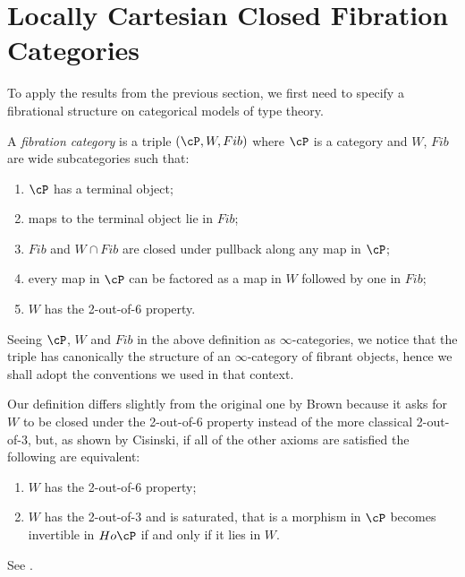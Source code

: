\chapter{Locally Cartesian Closed Fibration Categories}

To apply the results from the previous section, we first need to specify a
fibrational structure on categorical models of type theory.

\begin{defn}
  A \emph{fibration category} is a triple $(\cP,W,Fib)$ where $\cP$ is a
  category and $W$, $Fib$ are wide subcategories such that:
  \begin{enumerate}
    \item $\cP$ has a terminal object;
    \item maps to the terminal object lie in $Fib$;
    \item $Fib$ and $W\cap Fib$ are closed under pullback along any map in $\cP$;
    \item every map in $\cP$ can be factored as a map in $W$ followed by one in
      $Fib$;
    \item $W$ has the 2-out-of-6 property.
  \end{enumerate}
\end{defn}

\begin{rmk}
  Seeing $\cP$, $W$ and $Fib$ in the above definition as $\infty$-categories, we
  notice that the triple has canonically the structure of an $\infty$-category
  of fibrant objects, hence we shall adopt the conventions we used in that
  context.
\end{rmk}

\begin{rmk}\cite[Rem.~3.2.2]{AKL15}
  Our definition differs slightly from the original one by Brown
  because it asks for $W$ to be closed under the 2-out-of-6 property
  instead of the more classical 2-out-of-3, but, as shown by Cisinski, if all of
  the other axioms are satisfied the following are equivalent:
  \begin{enumerate}
    \item $W$ has the 2-out-of-6 property;
    \item $W$ has the 2-out-of-3 and is saturated, that is a morphism in $\cP$
      becomes invertible in $Ho\cP$ if and only if it lies in $W$.
  \end{enumerate}
  See \cite[Thm.~7.2.7]{RB06}.
\end{rmk}

